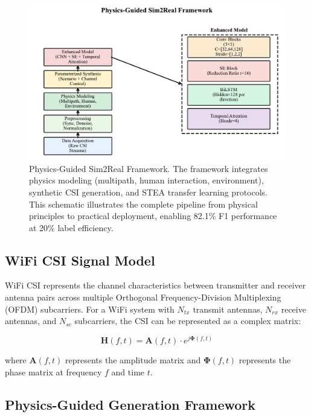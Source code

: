 \documentclass[journal]{IEEEtran}
\begin{document}
\begin{figure}[ht]
\centering
\includegraphics[width=\columnwidth]{figures/fig2_physics_guided_framework.pdf}%
\caption{Physics-Guided Sim2Real Framework. The framework integrates physics modeling (multipath, human interaction, environment), synthetic CSI generation, and STEA transfer learning protocols. This schematic illustrates the complete pipeline from physical principles to practical deployment, enabling 82.1\% F1 performance at 20\% label efficiency.}
\label{fig:physics_3d_framework}
\end{figure}

\subsection{WiFi CSI Signal Model}

WiFi CSI represents the channel characteristics between transmitter and receiver antenna pairs across multiple Orthogonal Frequency-Division Multiplexing (OFDM) subcarriers. For a WiFi system with $N_{tx}$ transmit antennas, $N_{rx}$ receive antennas, and $N_{sc}$ subcarriers, the CSI can be represented as a complex matrix:

\begin{equation}
\mathbf{H}(f,t) = \mathbf{A}(f,t) \cdot e^{j\boldsymbol{\Phi}(f,t)}
\end{equation}

where $\mathbf{A}(f,t)$ represents the amplitude matrix and $\boldsymbol{\Phi}(f,t)$ represents the phase matrix at frequency $f$ and time $t$.

\subsection{Physics-Guided Generation Framework}
\end{document}
